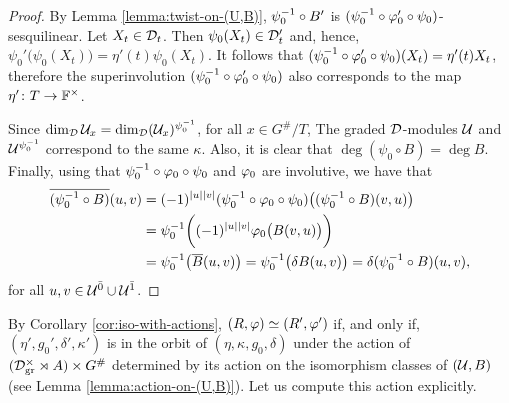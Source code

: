 \begin{proof}
    By Lemma \ref{lemma:twist-on-(U,B)}, $\psi_0^{-1} \circ B'$ is $(\psi_0^{-1} \circ \varphi_0' \circ \psi_0)$-sesquilinear. 
    Let $X_t \in \mathcal{D}_t$. 
    Then $\psi_0 (X_t)\in \mathcal{D}_t'$ and, hence, $\psi_0' \big(\psi_0 (X_t) \big) = \eta' (t) \psi_0 (X_t)$. 
    It follows that $(\psi_0^{-1} \circ \varphi_0' \circ \psi_0) (X_t) = \eta'(t) X_t$, therefore the superinvolution $(\psi_0^{-1} \circ \varphi_0' \circ \psi_0)$ also corresponds to the map $\eta'\colon T \to \mathbb{F}^\times$. 

    Since $\dim_{\mathcal{D}} \mathcal U_x = \dim_{\mathcal{D}} (\mathcal U_x)^{\psi_0^{-1}}$, for all $x \in G^\#/T$, The graded $\mathcal{D}$-modules $\mathcal U$ and $\mathcal U^{\psi_0^{-1}}$ correspond to the same $\kappa$. 
    Also, it is clear that $\deg (\psi_0 \circ B) = \deg B$. Finally, using that $\psi_0^{-1} \circ \varphi_0 \circ \psi_0$ and $\varphi_0$ are involutive, we have that
    \begin{align*}
        \overline{(\psi_0^{-1} \circ B)} (u,v) &= (-1)^{|u||v|} (\psi_0^{-1} \circ \varphi_0 \circ \psi_0) \big( (\psi_0^{-1} \circ B)(v, u) \big) \\
        &= \psi_0^{-1} \bigg( (-1)^{|u||v|} \varphi_0 \big( B(v,u) \big) \bigg) \\
        &= \psi_0^{-1} \big( \overline B (u,v) \big) = \psi_0^{-1} \big( \delta B (u,v) \big) = \delta (\psi_0^{-1} \circ B) (u,v),
    \end{align*}
    for all $u, v \in \mathcal U^{\bar0} \cup \mathcal U^{\bar1}$.
\end{proof}

By Corollary \ref{cor:iso-with-actions}, $(R, \varphi) \simeq (R', \varphi')$ if, and only if, $(\eta', g_0', \delta', \kappa')$ is in the orbit of $(\eta, \kappa, g_0, \delta)$ under the action of $(\mathcal{D}^\times_{\mathrm{gr}} \rtimes A ) \times G^\#$ determined by its action on the isomorphism classes of $(\mathcal U, B)$ (see Lemma \ref{lemma:action-on-(U,B)}). 
Let us compute this action explicitly. 


